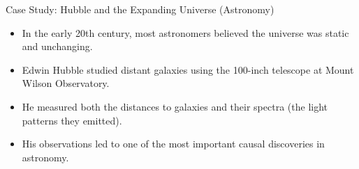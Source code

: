 \documentclass{beamer}
\begin{document}
\begin{frame}{Case Study: Hubble and the Expanding Universe (Astronomy)}
    \begin{itemize}
        \item In the early 20th century, most astronomers believed the universe was static and unchanging.
        \item Edwin Hubble studied distant galaxies using the 100-inch telescope at Mount Wilson Observatory.
        \item He measured both the distances to galaxies and their spectra (the light patterns they emitted).
        \item His observations led to one of the most important causal discoveries in astronomy.
    \end{itemize}
    
    \begin{center}
    \end{center}
\end{frame}
\end{document}
